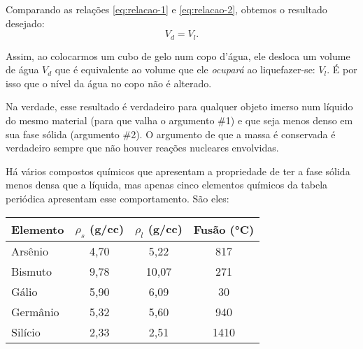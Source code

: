 \documentclass[a4paper,12pt]{article}
\begin{document}
  Comparando as relações \eqref{eq:relacao-1} e \eqref{eq:relacao-2}, obtemos o resultado desejado:
  \begin{equation*}
    V_{d} = V_{l}.
  \end{equation*}

  Assim, ao colocarmos um cubo de gelo num copo d'água, ele desloca um volume de água $V_{d}$ que é equivalente ao volume que ele \emph{ocupará} ao liquefazer-se: $V_{l}$.
  É por isso que o nível da água no copo não é alterado.
  
  Na verdade, esse resultado é verdadeiro para qualquer objeto imerso num líquido do mesmo material (para que valha o argumento \#1) e que seja menos denso em sua fase sólida (argumento \#2). O argumento de que a massa é conservada é verdadeiro sempre que não houver reações nucleares envolvidas.
  
  Há vários compostos químicos que apresentam a propriedade de ter a fase sólida menos densa que a líquida, mas apenas cinco elementos químicos da tabela periódica apresentam esse comportamento. São eles:
  
  \bigskip
  
  \hfill%
  \begin{tabular}{lccc}
  \toprule
  Elemento & $\rho_s$ (\si{g/cc}) & $\rho_l$ (\si{g/cc}) & Fusão (\si{\degreeCelsius})\\
  \midrule
  Arsênio & 4,70 & 5,22 & 817 \\
  Bismuto & 9,78 & 10,07 & 271\\
  Gálio   & 5,90 & 6,09 & 30 \\
  Germânio & 5,32 & 5,60 & 940 \\
  Silício & 2,33 & 2,51 & 1410\\
  \bottomrule
  \end{tabular}%
  \hfill{}

  
  
  
  
\end{document}

